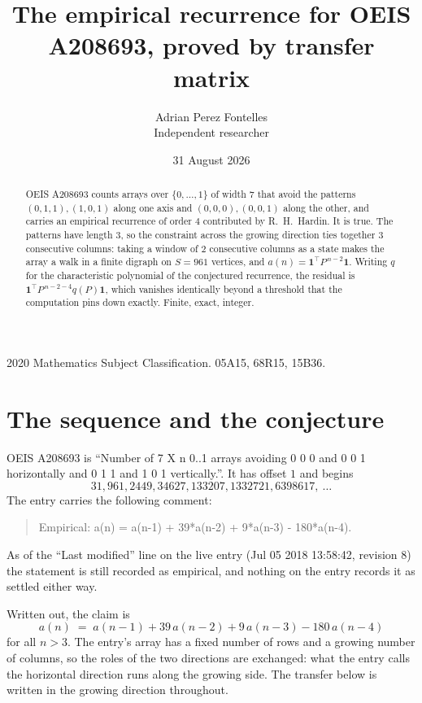 \documentclass[11pt,a4paper]{article}
\title{The empirical recurrence for OEIS A208693, proved by transfer matrix}
\author{Adrian Perez Fontelles\\ \small Independent researcher}
\date{31 August 2026}
\theoremstyle{plain}
\theoremstyle{definition}
\begin{document}
\maketitle

\begin{abstract}
OEIS A208693 counts arrays over $\{0,\dots,1\}$ of width $7$ that avoid the patterns
$(0,1,1), (1,0,1)$ along one axis and $(0,0,0), (0,0,1)$ along the other, and carries an empirical recurrence of
order $4$ contributed by R.~H.~Hardin. It is true. The patterns have length $3$, so
the constraint across the growing direction ties together $3$ consecutive columns: taking a
window of $2$ consecutive columns as a state makes the array a walk in a finite digraph
on $S=961$ vertices, and $a(n)=\mathbf{1}^{\!\top}P^{\,n-2}\mathbf{1}$. Writing $q$
for the characteristic polynomial of the conjectured recurrence, the residual is
$\mathbf{1}^{\!\top}P^{\,n-2-4}q(P)\mathbf{1}$, which vanishes identically
beyond a threshold that the computation pins down exactly. Finite, exact, integer.
\end{abstract}

\noindent\small 2020 Mathematics Subject Classification. 05A15, 68R15, 15B36.\normalsize

\section{The sequence and the conjecture}

OEIS A208693 is ``Number of 7 X n 0..1 arrays avoiding 0 0 0 and 0 0 1 horizontally and 0 1 1 and 1 0 1 vertically.''. It has offset
$1$ and begins
\[
31, 961, 2449, 34627, 133207, 1332721, 6398617,\ \dots
\]
The entry carries the following comment:
\begin{quote}\small
Empirical: a(n) = a(n-1) + 39*a(n-2) + 9*a(n-3) - 180*a(n-4).
\end{quote}
As of the ``Last modified'' line on the live entry (Jul 05 2018 13:58:42, revision
8) the statement is still recorded as empirical, and nothing on the entry
records it as settled either way.

Written out, the claim is
\begin{equation}\label{eq:conj}
a(n)\;=\;a(n-1) + 39\,a(n-2) + 9\,a(n-3) - 180\,a(n-4)
\end{equation}
for all $n>3$. The entry's array has a fixed number of rows and a growing number of
columns, so the roles of the two directions are exchanged: what the entry calls the
horizontal direction runs along the growing side. The transfer below is written in the
growing direction throughout.
\end{document}
